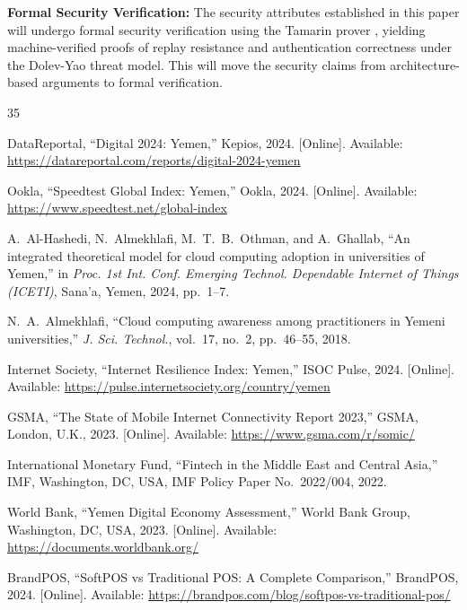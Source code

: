 \documentclass[conference,10pt]{IEEEtran}
\begin{document}
\textbf{Formal Security Verification:} The security attributes established in this paper will undergo formal security verification using the Tamarin prover \cite{meier2013}, yielding machine-verified proofs of replay resistance and authentication correctness under the Dolev-Yao threat model. This will move the security claims from architecture-based arguments to formal verification.

\begin{thebibliography}{35}

DataReportal, ``Digital 2024: Yemen,'' Kepios, 2024. [Online]. Available: \url{https://datareportal.com/reports/digital-2024-yemen}

Ookla, ``Speedtest Global Index: Yemen,'' Ookla, 2024. [Online]. Available: \url{https://www.speedtest.net/global-index}

A.~Al-Hashedi, N.~Almekhlafi, M.~T.~B.~Othman, and A.~Ghallab, ``An integrated theoretical model for cloud computing adoption in universities of Yemen,'' in \emph{Proc. 1st Int. Conf. Emerging Technol. Dependable Internet of Things (ICETI)}, Sana'a, Yemen, 2024, pp.~1--7.

N.~A.~Almekhlafi, ``Cloud computing awareness among practitioners in Yemeni universities,'' \emph{J. Sci. Technol.}, vol.~17, no.~2, pp.~46--55, 2018.

Internet Society, ``Internet Resilience Index: Yemen,'' ISOC Pulse, 2024. [Online]. Available: \url{https://pulse.internetsociety.org/country/yemen}

GSMA, ``The State of Mobile Internet Connectivity Report 2023,'' GSMA, London, U.K., 2023. [Online]. Available: \url{https://www.gsma.com/r/somic/}

International Monetary Fund, ``Fintech in the Middle East and Central Asia,'' IMF, Washington, DC, USA, IMF Policy Paper No.~2022/004, 2022.

World Bank, ``Yemen Digital Economy Assessment,'' World Bank Group, Washington, DC, USA, 2023. [Online]. Available: \url{https://documents.worldbank.org/}

BrandPOS, ``SoftPOS vs Traditional POS: A Complete Comparison,'' BrandPOS, 2024. [Online]. Available: \url{https://brandpos.com/blog/softpos-vs-traditional-pos/}


\end{thebibliography}
\end{document}
